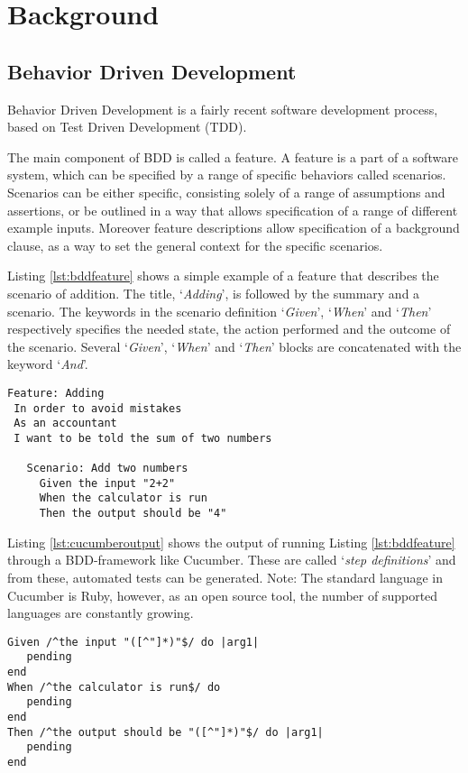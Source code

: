 \section{Background}
\label{sec:Background}

\subsection{Behavior Driven Development}
\label{sub:bdd}
Behavior Driven Development is a fairly recent software development process, based on Test Driven Development (TDD).

The main component of BDD is called a feature. 
A feature is a part of a software system,
which can be specified by a range of specific behaviors called scenarios. Scenarios can be either specific, consisting solely of a range of assumptions and assertions, or be outlined in a way that allows
specification of a range of different example inputs.
Moreover feature descriptions allow specification of a background clause,
as a way to set the general context for the specific scenarios.

Listing \ref{lst:bddfeature} shows a simple example of a feature that describes the scenario of addition. 
The title, `\emph{Adding}', is followed by the summary and a scenario. The keywords in the scenario definition `\emph{Given}', `\emph{When}' and `\emph{Then}' respectively specifies the needed state, the action performed and the outcome of the scenario. 
Several `\emph{Given}', `\emph{When}' and `\emph{Then}' blocks are concatenated with the keyword `\emph{And}'.

\begin{lstlisting}[caption={Sample Addition Feature},label={lst:bddfeature}]
Feature: Adding
 In order to avoid mistakes 
 As an accountant
 I want to be told the sum of two numbers

   Scenario: Add two numbers
     Given the input "2+2"
     When the calculator is run 
     Then the output should be "4"
\end{lstlisting}

Listing \ref{lst:cucumberoutput} shows the output of running Listing \ref{lst:bddfeature} through a BDD-framework like Cucumber.
These are called `\emph{step definitions}' and from these, automated tests can be generated. 
Note: The standard language in Cucumber is Ruby, however, as an open source tool, the number of supported languages are constantly growing. 

\begin{lstlisting}[caption={Sample Cucumber Output},label={lst:cucumberoutput}]
Given /^the input "([^"]*)"$/ do |arg1|
   pending
end
When /^the calculator is run$/ do
   pending
end
Then /^the output should be "([^"]*)"$/ do |arg1|
   pending
end
\end{lstlisting}

